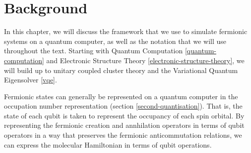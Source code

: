 \chapter{\label{background}Background}
In this chapter, we will discuss the framework that we use to simulate fermionic systems on a quantum computer, as well as the notation that we will use throughout the text. Starting with Quantum Computation \ref{quantum-computation} and Electronic Structure Theory \ref{electronic-structure-theory}, we will build up to unitary coupled cluster theory and the Variational Quantum Eigensolver \ref{vqe}.

Fermionic states can generally be represented on a quantum computer in the occupation number representation (section \ref{second-quantisation}). That is, the state of each qubit is taken to represent the occupancy of each spin orbital. By representing the fermionic creation and annhilation operators in terms of qubit operators in a way that preserves the fermionic anticommutation relations, we can express the molecular Hamiltonian in terms of qubit operations.
